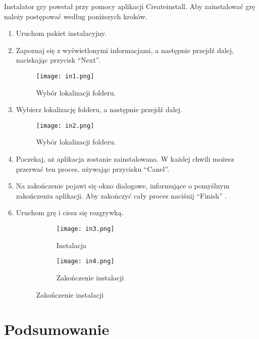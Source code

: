 \documentclass[]{report}
\begin{document}
	Instalator gry powstał przy pomocy aplikacji Createinstall. 
	Aby zainstalować grę należy postępować według poniższych kroków.
	\begin{enumerate}
		\item Uruchom pakiet instalacyjny.
		
		\item Zapoznaj się z wyświetlonymi informacjami, a następnie przejdź dalej, naciskając przycisk \enquote{Next}.
		\begin{figure}[h]
			\centering
			\texttt{[image: in1.png]}
			\caption{Wybór lokalizacji folderu.}
			\label{fig:in3}
		\end{figure}
		
		
		\item Wybierz lokalizację folderu, a następnie przejdź dalej.
		
		\begin{figure}[h]
			\centering
			\texttt{[image: in2.png]}
			\caption{Wybór lokalizacji folderu.}
			\label{fig:in2}
		\end{figure}
		
		\item Poczekaj, aż aplikacja zostanie zainstalowana. W każdej chwili możesz przerwać ten proces, używając przycisku \enquote{Canel}.
		
		\item Na zakończenie pojawi się okno dialogowe, informujące o pomyślnym zakończeniu aplikacji. Aby zakończyć cały proces naciśnij \enquote{Finish} .
		\item Uruchom grę i ciesz się rozgrywką. 
		
		\begin{figure}[h]
			\centering
			\begin{subfigure}{0.45\textwidth}
				\centering
				\texttt{[image: in3.png]}
				\caption{Instalacja}
				\label{fig:in3}
			\end{subfigure}
			\hfill
			\begin{subfigure}{0.45\textwidth}
				\centering
				\texttt{[image: in4.png]}
				\caption{Zakończenie instalacji}
				\label{fig:in4}
			\end{subfigure}
		\end{figure}
	\end{enumerate}

	\newpage
	
\clearpage
	
	
\section*{Podsumowanie}
\end{document}
